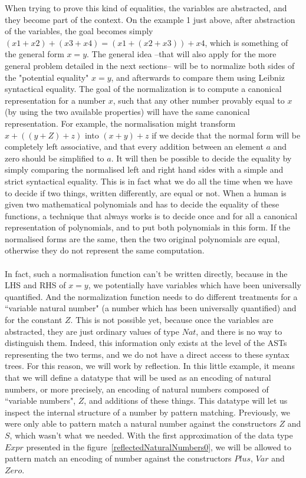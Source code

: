 When trying to prove this kind of equalities, the variables are abstracted, and they become part of the context. On the example 1 just above, after abstraction of the variables, the goal becomes simply $(x1 + x2) + (x3 + x4) = (x1 + (x2 + x3)) + x4$, which is something of the general form $x=y$.
The general idea --that will also apply for the more general problem detailed in the next sections-- will be to normalize both sides of the "potential equality" $x=y$, and afterwards to compare them using Leibniz syntactical equality.
The goal of the normalization is to compute a canonical representation for a number $x$, such that any other number provably equal to $x$ (by using the two available properties) will have the same canonical representation. For example, the normalisation might transform $x+((y+Z)+z)$ into $(x+y)+z$ if we decide that the normal form will be completely left associative, and that every addition between an element $a$ and zero should be simplified to $a$. It will then be possible to decide the equality by simply comparing the normalised left and right hand sides with a simple and strict syntactical equality. This is in fact what we do all the time when we have to decide if two things, written differently, are equal or not. When a human is given two mathematical polynomials and has to decide the equality of these functions, a technique that always works is to decide once and for all a canonical representation of polynomials, and to put both polynomials in this form. If the normalised forms are the same, then the two original polynomials are equal, otherwise they do not represent the same computation.\\
\\
In fact, such a normalisation function can't be written directly, because in the LHS and RHS of $x=y$, we potentially have variables which have been universally quantified. And the normalization function needs to do different treatments for a ``variable natural number" (a number which has been universally quantified) and for the constant $Z$. This is not possible yet, because once the variables are abstracted, they are just ordinary values of type $Nat$, and there is no way to distinguish them. Indeed, this information only exists at the level of the ASTs representing the two terms, and we do not have a direct access to these syntax trees.
For this reason, we will work by reflection. In this little example, it means that we will define a datatype that will be used as an encoding of natural numbers, or more precisely, an encoding of natural numbers composed of ``variable numbers", $Z$, and additions of these things. This datatype will let us inspect the internal structure of a number by pattern matching.
Previously, we were only able to pattern match a natural number against the constructors $Z$ and $S$, which wasn't what we needed.  With the first approximation of the data type $Expr$ presented in the figure~\ref{reflectedNaturalNumbers0}, we will be allowed to pattern match an encoding of number against the constructors $Plus$, $Var$ and $Zero$.


